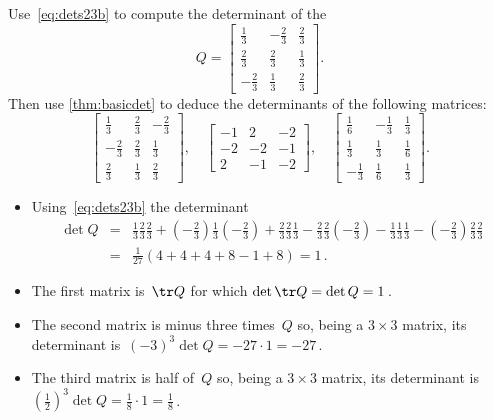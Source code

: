 \begin{example} 
Use~\eqref{eq:dets23b} to compute the determinant of the 
\begin{equation*}
Q=\begin{bmatrix} \frac13&-\frac23&\frac23
\\\frac23&\frac23&\frac13
\\-\frac23&\frac13&\frac23 \end{bmatrix}.
\end{equation*}
Then use \cref{thm:basicdet} to deduce the determinants of the following matrices:
\begin{equation*}
\begin{bmatrix} \frac13&\frac23&-\frac23
\\-\frac23&\frac23&\frac13
\\\frac23&\frac13&\frac23 \end{bmatrix}
,\quad
\begin{bmatrix} -1&2&-2
\\-2&-2&-1
\\2&-1&-2 \end{bmatrix}
,\quad
\begin{bmatrix} \frac16&-\frac13&\frac13
\\\frac13&\frac13&\frac16
\\-\frac13&\frac16&\frac13 \end{bmatrix}.
\end{equation*}

\begin{solution} 
\begin{itemize}
\item Using~\eqref{eq:dets23b} the determinant
\begin{eqnarray*}
\det Q&=&\tfrac13\tfrac23\tfrac23+(-\tfrac23)\tfrac13(-\tfrac23)
+\tfrac23\tfrac23\tfrac13
-\tfrac23\tfrac23(-\tfrac23)
-\tfrac13\tfrac13\tfrac13-(-\tfrac23)\tfrac23\tfrac23
\\&=&\tfrac1{27}(4+4+4+8-1+8)=1\,.
\end{eqnarray*}

\item The first matrix is~\(\tr Q\) for which \(\det\tr Q=\det Q=1\)\,.

\item The second matrix is minus three times~\(Q\) so, being a \(3\times3\) matrix, its determinant is~\((-3)^3\det Q=-27\cdot1=-27\)\,.

\item The third matrix is half of~\(Q\) so, being a \(3\times3\) matrix, its determinant is~\((\tfrac12)^3\det Q=\frac18\cdot1=\frac18\)\,.
\aqed

\end{itemize}
\end{solution}
\end{example}



